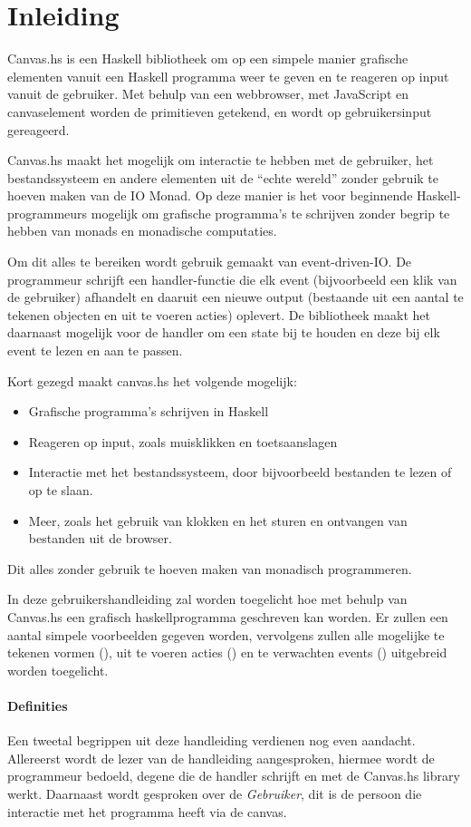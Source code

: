 \section{Inleiding}

Canvas.hs is een Haskell bibliotheek om op een simpele manier grafische elementen vanuit een Haskell programma weer te geven en te reageren op input vanuit de gebruiker. Met behulp van een webbrowser, met JavaScript en canvaselement worden de primitieven getekend, en wordt op gebruikersinput gereageerd.

Canvas.hs maakt het mogelijk om interactie te hebben met de gebruiker, het bestandssysteem en andere elementen uit de ``echte wereld'' zonder gebruik te hoeven maken van de IO Monad. Op deze manier is het voor beginnende Haskell-programmeurs mogelijk om grafische programma's te schrijven zonder begrip te hebben van monads en monadische computaties.

Om dit alles te bereiken wordt gebruik gemaakt van event-driven-IO. De programmeur schrijft een handler-functie die elk event (bijvoorbeeld een klik van de gebruiker) afhandelt en daaruit een nieuwe output (bestaande uit een aantal te tekenen objecten en uit te voeren acties) oplevert. De bibliotheek maakt het daarnaast mogelijk voor de handler om een state bij te houden en deze bij elk event te lezen en aan te passen. 

Kort gezegd maakt canvas.hs het volgende mogelijk:
\begin{itemize}
	\item Grafische programma's schrijven in Haskell
	\item Reageren op input, zoals muisklikken en toetsaanslagen
	\item Interactie met het bestandssysteem, door bijvoorbeeld bestanden te lezen of op te slaan.
	\item Meer, zoals het gebruik van klokken en het sturen en ontvangen van bestanden uit de browser.
\end{itemize}
Dit alles zonder gebruik te hoeven maken van monadisch programmeren. 

In deze gebruikershandleiding zal worden toegelicht hoe met behulp van Canvas.hs een grafisch haskellprogramma geschreven kan worden. Er zullen een aantal simpele voorbeelden gegeven worden, vervolgens zullen alle mogelijke te tekenen vormen (\shapes), uit te voeren acties (\actions) en te verwachten events (\events) uitgebreid worden toegelicht. 

\paragraph{Definities}
Een tweetal begrippen uit deze handleiding verdienen nog even aandacht. Allereerst wordt de lezer van de handleiding aangesproken, hiermee wordt de programmeur bedoeld, degene die de handler schrijft en met de Canvas.hs library werkt. Daarnaast wordt gesproken over de \emph{Gebruiker}, dit is de persoon die interactie met het programma heeft via de canvas.
